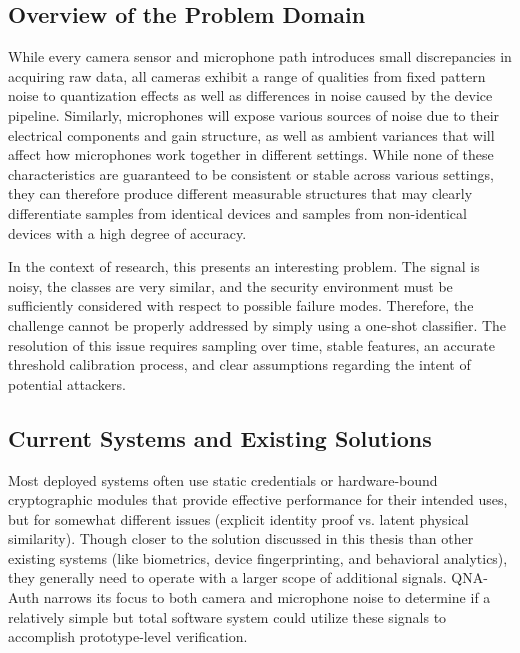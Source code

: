 \subsection{Overview of the Problem Domain}
While every camera sensor and microphone path introduces small discrepancies in acquiring raw data, all cameras exhibit a range of qualities from fixed pattern noise to quantization effects as well as differences in noise caused by the device pipeline. Similarly, microphones will expose various sources of noise due to their electrical components and gain structure, as well as ambient variances that will affect how microphones work together in different settings. While none of these characteristics are guaranteed to be consistent or stable across various settings, they can therefore produce different measurable structures that may clearly differentiate samples from identical devices and samples from non-identical devices with a high degree of accuracy.

In the context of research, this presents an interesting problem. The signal is noisy, the classes are very similar, and the security environment must be sufficiently considered with respect to possible failure modes. Therefore, the challenge cannot be properly addressed by simply using a one-shot classifier. The resolution of this issue requires sampling over time, stable features, an accurate threshold calibration process, and clear assumptions regarding the intent of potential attackers.

\subsection{Current Systems and Existing Solutions}
Most deployed systems often use static credentials or hardware-bound cryptographic modules that provide effective performance for their intended uses, but for somewhat different issues (explicit identity proof vs. latent physical similarity). Though closer to the solution discussed in this thesis than other existing systems (like biometrics, device fingerprinting, and behavioral analytics), they generally need to operate with a larger scope of additional signals. QNA-Auth narrows its focus to both camera and microphone noise to determine if a relatively simple but total software system could utilize these signals to accomplish prototype-level verification.

